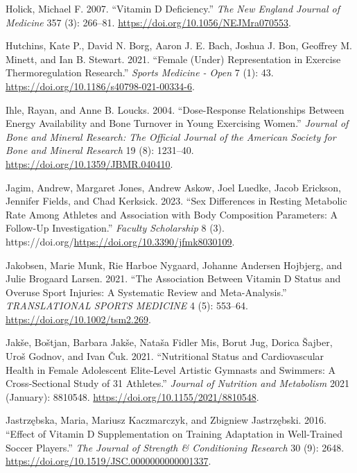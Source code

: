 \documentclass[
]{article}
\newlength{\cslhangindent}
\newenvironment{CSLReferences}[2] %
 {\begin{list}{}{%
  \setlength{\itemindent}{0pt}
  \setlength{\leftmargin}{0pt}
  \setlength{\parsep}{0pt}
  \ifodd #1
   \setlength{\leftmargin}{\cslhangindent}
   \setlength{\itemindent}{-1\cslhangindent}
  \fi
  \setlength{\itemsep}{#2\baselineskip}}}
 {\end{list}}
\begin{document}
\begin{CSLReferences}{1}{0}
Holick, Michael F. 2007. {``Vitamin {D} Deficiency.''} \emph{The New England Journal of Medicine} 357 (3): 266--81. \url{https://doi.org/10.1056/NEJMra070553}.

Hutchins, Kate P., David N. Borg, Aaron J. E. Bach, Joshua J. Bon, Geoffrey M. Minett, and Ian B. Stewart. 2021. {``Female ({Under}) {Representation} in {Exercise} {Thermoregulation} {Research}.''} \emph{Sports Medicine - Open} 7 (1): 43. \url{https://doi.org/10.1186/s40798-021-00334-6}.

Ihle, Rayan, and Anne B. Loucks. 2004. {``Dose-Response Relationships Between Energy Availability and Bone Turnover in Young Exercising Women.''} \emph{Journal of Bone and Mineral Research: The Official Journal of the American Society for Bone and Mineral Research} 19 (8): 1231--40. \url{https://doi.org/10.1359/JBMR.040410}.

Jagim, Andrew, Margaret Jones, Andrew Askow, Joel Luedke, Jacob Erickson, Jennifer Fields, and Chad Kerksick. 2023. {``Sex {Differences} in {Resting} {Metabolic} {Rate} Among {Athletes} and {Association} with {Body} {Composition} {Parameters}: {A} {Follow}-{Up} {Investigation}.''} \emph{Faculty Scholarship} 8 (3). https://doi.org/\url{https://doi.org/10.3390/jfmk8030109}.

Jakobsen, Marie Munk, Rie Harboe Nygaard, Johanne Andersen Hojbjerg, and Julie Brogaard Larsen. 2021. {``The Association Between Vitamin {D} Status and Overuse Sport Injuries: {A} Systematic Review and Meta-Analysis.''} \emph{TRANSLATIONAL SPORTS MEDICINE} 4 (5): 553--64. \url{https://doi.org/10.1002/tsm2.269}.

Jakše, Boštjan, Barbara Jakše, Nataša Fidler Mis, Borut Jug, Dorica Šajber, Uroš Godnov, and Ivan Čuk. 2021. {``Nutritional {Status} and {Cardiovascular} {Health} in {Female} {Adolescent} {Elite}-{Level} {Artistic} {Gymnasts} and {Swimmers}: {A} {Cross}-{Sectional} {Study} of 31 {Athletes}.''} \emph{Journal of Nutrition and Metabolism} 2021 (January): 8810548. \url{https://doi.org/10.1155/2021/8810548}.

Jastrzębska, Maria, Mariusz Kaczmarczyk, and Zbigniew Jastrzębski. 2016. {``Effect of {Vitamin} {D} {Supplementation} on {Training} {Adaptation} in {Well}-{Trained} {Soccer} {Players}.''} \emph{The Journal of Strength \& Conditioning Research} 30 (9): 2648. \url{https://doi.org/10.1519/JSC.0000000000001337}.


\end{CSLReferences}
\end{document}
